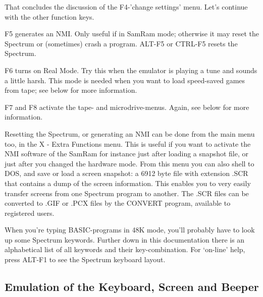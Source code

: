     That concludes the discussion of the F4-'change settings' menu.  Let's
    continue with the other function keys.

\noindent
    F5 generates an NMI\@.  Only useful if in SamRam mode; otherwise it may
    reset the Spectrum or (sometimes) crash a program.  ALT-F5 or CTRL-F5
    resets the Spectrum.

\noindent
    F6 turns on Real Mode.  Try this when the emulator is playing a tune and
    sounds a little harsh.  This mode is needed when you want to load
    speed-saved games from tape; see below for more information.

\noindent
    F7 and F8 activate the tape- and microdrive-menus.  Again, see below for
    more information.

\noindent
    Resetting the Spectrum, or generating an NMI can be done from the main
    menu too, in the X - Extra Functions menu.  This is useful if you want
    to activate the NMI software of the SamRam for instance just after
    loading a snapshot file, or just after you changed the hardware mode.
    From this menu you can also shell to DOS, and save or load a screen
    snapshot: a 6912 byte file with extension .SCR that contains a dump of
    the screen information.  This enables you to very easily transfer
    screens from one Spectrum program to another.  The .SCR files can be
    converted to .GIF or .PCX files by the CONVERT program, available to
    registered users.

    When you're typing BASIC-programs in 48K mode, you'll probably have to
    look up some Spectrum keywords.  Further down in this documentation
    there is an alphabetical list of all keywords and their key-combination.
    For `on-line' help, press ALT-F1 to see the Spectrum keyboard layout.



\subsection{Emulation of the Keyboard, Screen and Beeper}

